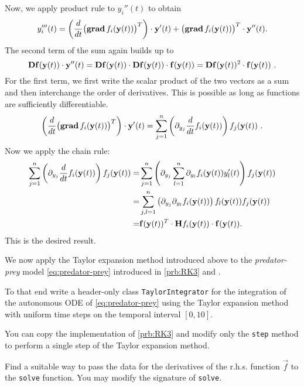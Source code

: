 \begin{problem}
\begin{subproblem}[5]
\begin{solution}
Now, we apply product rule to $y_i''(t)$ to obtain
$$ y_i'''(t) = \left(\frac{d}{dt}\bigl(\operatorname{{\bf grad}} f_i({\mathbf{y}}(t))\bigr)^T \right)\cdot{\mathbf{y}}'(t) + \bigl(\operatorname{{\bf grad}} f_i({\mathbf{y}}(t))\bigr)^T \cdot{\mathbf{y}}''(t).$$
The second term of the sum again builds up to
$$ {\mathbf{D}}{\mathbf{f}}({\mathbf{y}}(t))\cdot{\mathbf{y}}''(t) = {\mathbf{D}}{\mathbf{f}}({\mathbf{y}}(t))\cdot{\mathbf{D}}{\mathbf{f}}({\mathbf{y}}(t))\cdot{\mathbf{f}}({\mathbf{y}}(t)) = {\mathbf{D}}{\mathbf{f}}({\mathbf{y}}(t))^2\cdot{\mathbf{f}}({\mathbf{y}}(t))\ .$$
For the first term, we first write the scalar product of the two vectors as a sum and then interchange the order of derivatives.
This is possible as long as functions are sufficiently differentiable.
$$ \left(\frac{d}{dt} \bigl(\grad f_i(\Vy(t))\bigr)^T\right)\cdot\Vy'(t) 
= \sum_{j=1}^n \left(\partial_{y_j}\frac{d}{dt}f_i(\Vy(t))\right)f_j(\Vy(t))\ .$$
Now we apply the chain rule:
\begin{align*}
\sum_{j=1}^n\left(\partial_{y_j}\frac{d}{dt}f_i({\mathbf{y}}(t))\right) f_j({\mathbf{y}}(t))
    =& \sum_{j=1}^n \left(\partial_{y_j}\sum_{l=1}^n \partial_{y_l}f_i({\mathbf{y}}(t))y_l'(t)\right)f_j({\mathbf{y}}(t))\\
    =& \sum_{j,l=1}^n\left(\partial_{y_j}\partial_{y_l}f_i({\mathbf{y}}(t))\right) f_l({\mathbf{y}}(t))f_j({\mathbf{y}}(t))\\
    =& {\mathbf{f}}({\mathbf{y}}(t))^T \cdot {\mathbf{H}} f_i({\mathbf{y}}(t)) \cdot {\mathbf{f}}({\mathbf{y}}(t)).
  \end{align*}
This is the desired result.
\end{solution}
\end{subproblem}


\begin{subproblem}[4] \label{subprb:TaylorODE_3}     %
We now apply the Taylor expansion method introduced above to the \emph{predator-prey} model \eqref{eq:predator-prey} introduced in \ref{prb:RK3} and .
    
To that end write a header-only \Cpp{} class \verb|TaylorIntegrator| for the integration of the autonomous ODE of \eqref{eq:predator-prey} using the Taylor expansion method with uniform time steps on the temporal interval $[0, 10]$.

\begin{hint}
 You can copy the implementation of \ref{prb:RK3} and modify only the \verb|step| method to perform a single step of the Taylor expansion method.
\end{hint}

\begin{hint}
 Find a suitable way to pass the data for the derivatives of the r.h.s. function $\vec{f}$ to the \verb|solve| function. You may modify the signature of \verb|solve|.
\end{hint}


\end{subproblem}
\end{problem}
